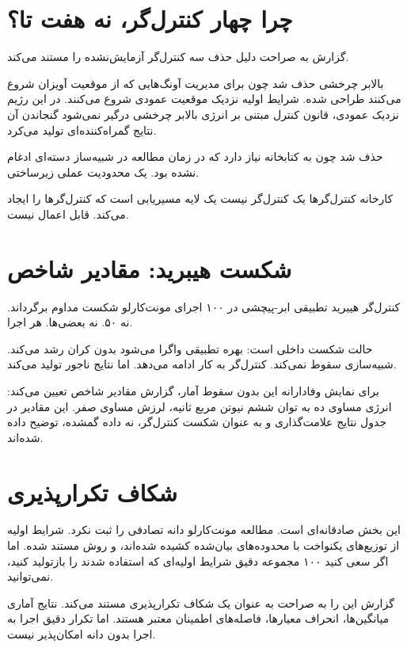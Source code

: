 \documentclass[12pt, a4paper]{article}
\newcommand{\dash}{\lr{---}}
\begin{document}
\section{چرا چهار کنترل‌گر، نه هفت تا؟}

گزارش به صراحت دليل حذف سه کنترل‌گر آزمايش‌نشده را مستند می‌کند.

 بالابر چرخشی حذف شد چون برای مديريت آونگ‌هايی که از موقعيت آويزان شروع می‌کنند طراحی شده. شرايط اوليه  نزديک موقعيت عمودی شروع می‌کنند. در اين رژيم نزديک عمودی، قانون کنترل مبتنی بر انرژی بالابر چرخشی درگير نمی‌شود \dash{} گنجاندن آن نتايج گمراه‌کننده‌ای توليد می‌کرد.

 حذف شد چون به کتابخانه  نياز دارد که در زمان مطالعه  در شبيه‌ساز دسته‌ای ادغام نشده بود. يک محدوديت عملی زيرساختی.

کارخانه کنترل‌گرها يک کنترل‌گر نيست \dash{} يک لايه مسيريابی است که کنترل‌گرها را ايجاد می‌کند. قابل اعمال نيست.

\section{شکست هيبريد: مقادير شاخص}

کنترل‌گر هيبريد تطبيقی ابر-پيچشی در ۱۰۰ اجرای مونت‌کارلو شکست مداوم برگرداند. نه ۵۰. نه بعضی‌ها. هر اجرا.

حالت شکست داخلی است: بهره تطبيقی واگرا می‌شود \dash{} بدون کران رشد می‌کند. شبيه‌سازی سقوط نمی‌کند. کنترل‌گر به کار ادامه می‌دهد. اما نتایج ناجور توليد می‌کند.

برای نمايش وفادارانه اين بدون سقوط آمار، گزارش مقادير شاخص تعيين می‌کند: انرژی مساوی ده به توان ششم نيوتن مربع ثانيه، لرزش مساوی صفر. اين مقادير در جدول نتايج علامت‌گذاری و به عنوان شکست کنترل‌گر، نه داده گمشده، توضيح داده شده‌اند.

\section{شکاف تکرارپذيری}

اين بخش صادقانه‌ای است. مطالعه مونت‌کارلو  دانه تصادفی را ثبت نکرد. شرايط اوليه از توزيع‌های يکنواخت با محدوده‌های بيان‌شده کشيده شده‌اند، و روش مستند شده. اما اگر سعی کنيد ۱۰۰ مجموعه دقيق شرايط اوليه‌ای که استفاده شدند را بازتوليد کنيد، نمی‌توانيد.

گزارش اين را به صراحت به عنوان يک شکاف تکرارپذيری مستند می‌کند. نتايج آماری \dash{} ميانگين‌ها، انحراف معيارها، فاصله‌های اطمينان \dash{} معتبر هستند. اما تکرار دقيق اجرا به اجرا بدون دانه امکان‌پذير نيست.
\end{document}
